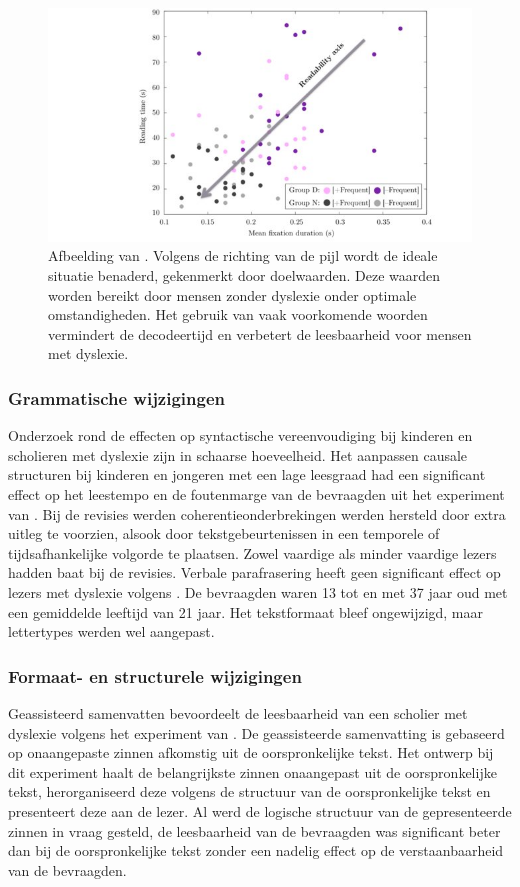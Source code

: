 \begin{figure}
	\includegraphics[width=\linewidth]{img/readability-mean-fixation-duration.png}
	\caption{Afbeelding van \textcite{Rello2013a}. Volgens de richting van de pijl wordt de ideale situatie benaderd, gekenmerkt door doelwaarden. Deze waarden worden bereikt door mensen zonder dyslexie onder optimale omstandigheden. Het gebruik van vaak voorkomende woorden vermindert de decodeertijd en verbetert de leesbaarheid voor mensen met dyslexie.}
\end{figure}

\subsubsection{Grammatische wijzigingen}

Onderzoek rond de effecten op syntactische vereenvoudiging bij kinderen en scholieren met dyslexie zijn in schaarse hoeveelheid. Het aanpassen causale structuren bij kinderen en jongeren met een lage leesgraad had een significant effect op het leestempo en de foutenmarge van de bevraagden uit het experiment van \textcite{Linderholm2000}. Bij de revisies werden coherentieonderbrekingen werden hersteld door extra uitleg te voorzien, alsook door tekstgebeurtenissen in een temporele of tijdsafhankelijke volgorde te plaatsen. Zowel vaardige als minder vaardige lezers hadden baat bij de revisies. Verbale parafrasering heeft geen significant effect op lezers met dyslexie volgens \textcite{Rello2013c}. De bevraagden waren 13 tot en met 37 jaar oud met een gemiddelde leeftijd van 21 jaar. Het tekstformaat bleef ongewijzigd, maar lettertypes werden wel aangepast. 

\subsubsection{Formaat- en structurele wijzigingen}
Geassisteerd samenvatten bevoordeelt de leesbaarheid van een scholier met dyslexie volgens het experiment van \textcite{Nandhini2013}. De geassisteerde samenvatting is gebaseerd op onaangepaste zinnen afkomstig uit de oorspronkelijke tekst. Het ontwerp bij dit experiment haalt de belangrijkste zinnen onaangepast uit de oorspronkelijke tekst, herorganiseerd deze volgens de structuur van de oorspronkelijke tekst en presenteert deze aan de lezer. Al werd de logische structuur van de gepresenteerde zinnen in vraag gesteld, de leesbaarheid van de bevraagden was significant beter dan bij de oorspronkelijke tekst zonder een nadelig effect op de verstaanbaarheid van de bevraagden.

